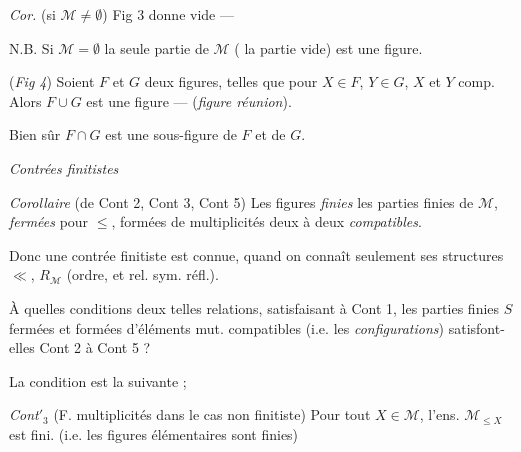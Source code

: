 \documentclass[11pt,a4paper]{article}
\begin{document}
\emph{Cor.} (si $\mathcal{M} \neq \emptyset$) \struck{\ill{}} Fig 3 donne \ill{} vide —

N.B. Si $\mathcal{M} = \emptyset$ \ill{} la seule partie de $\mathcal{M}$ ( la partie vide) est une figure.


(\emph{Fig 4}) Soient $F$ et $G$ deux figures, telles que pour  $X \in F$, $Y \in G$, $X$ et $Y$ comp. Alors $F \cup G$ est une figure — (\emph{figure réunion}).

Bien sûr $F \cap G$ est une sous-figure de $F$ et de $G$.


\emph{Contrées finitistes} 

\emph{Corollaire} (de Cont 2, Cont 3, Cont 5) Les figures \emph{finies} \struck{\ill{}} \ill{} les parties finies de $\mathcal{M}$, \emph{fermées} pour $\leq$, formées de multiplicités deux à deux \emph{compatibles}.

   Donc une contrée finitiste est connue, quand on connaît seulement ses structures $\ll$, $R_{\mathcal{M}}$ (ordre, et rel. sym. réfl.). 

À quelles conditions  deux telles relations, satisfaisant à Cont 1, les parties finies $S$ fermées \struck{\ill{}} et formées d'éléments mut. compatibles (i.e. les \emph{configurations}) satisfont-elles Cont 2 à Cont 5 ?

\struck{\ill{}} La condition \ill{} est la suivante ; \struck{\ill{}}

\emph{Cont$'_3$} (F. multiplicités dans le cas non finitiste) \struck{\ill{}} Pour tout $X \in \mathcal{M}$,  l'ens. $\mathcal{M}_{\leq X}$ est fini. (i.e. les figures élémentaires sont finies)
\end{document}
